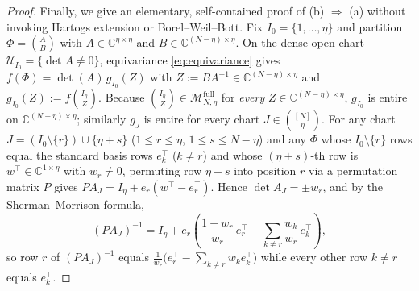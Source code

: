 \documentclass[11pt,a4paper]{article}
\theoremstyle{definition}
\newcommand{\C}{\mathbb{C}}
\begin{document}
\begin{proof}
Finally, we give an elementary, self-contained proof of (b) $\Rightarrow$ (a) without invoking Hartogs extension or Borel--Weil--Bott. Fix $I_0 = \{1,\dots,\eta\}$ and partition $\Phi = \binom{A}{B}$ with $A \in \C^{\eta\times\eta}$ and $B \in \C^{(N-\eta)\times \eta}$. On the dense open chart $\mathcal{U}_{I_0} = \{\det A \neq 0\}$, equivariance \eqref{eq:equivariance} gives $f(\Phi) = \det(A)\, g_{I_0}(Z)$ with $Z := B A^{-1} \in \C^{(N-\eta)\times\eta}$ and $g_{I_0}(Z) := f\binom{I_\eta}{Z}$. Because $\binom{I_\eta}{Z} \in \mathcal{M}_{N,\eta}^{\mathrm{full}}$ for \emph{every} $Z \in \C^{(N-\eta)\times \eta}$, $g_{I_0}$ is entire on $\C^{(N-\eta)\times \eta}$; similarly $g_J$ is entire for every chart $J \in \binom{[N]}{\eta}$.
For any chart $J = (I_0 \setminus \{r\}) \cup \{\eta + s\}$ ($1 \le r \le \eta$, $1 \le s \le N-\eta$) and any $\Phi$ whose $I_0 \setminus \{r\}$ rows equal the standard basis rows $e_k^\top$ ($k \neq r$) and whose $(\eta + s)$-th row is $w^\top \in \C^{1\times\eta}$ with $w_r \neq 0$, permuting row $\eta + s$ into position $r$ via a permutation matrix $P$ gives $P A_J = I_\eta + e_r (w^\top - e_r^\top)$. Hence $\det A_J = \pm w_r$, and by the Sherman--Morrison formula,
\begin{equation}\label{eq:sherman_morrison}
  (P A_J)^{-1} = I_\eta + e_r \left(\frac{1 - w_r}{w_r}\, e_r^\top - \sum_{k \neq r} \frac{w_k}{w_r}\, e_k^\top\right),
\end{equation}
so row $r$ of $(P A_J)^{-1}$ equals $\frac{1}{w_r}\big(e_r^\top - \sum_{k \neq r} w_k e_k^\top\big)$ while every other row $k \neq r$ equals $e_k^\top$.


\end{proof}
\end{document}
